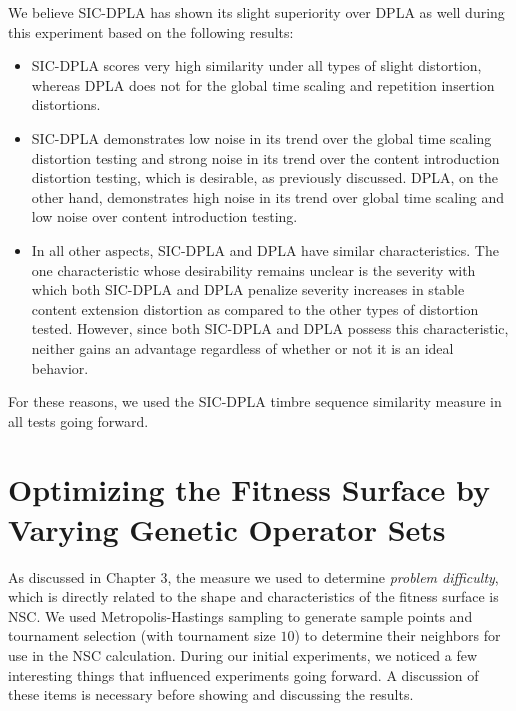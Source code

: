 \documentclass[a4paper,12pt]{report} 	%
\numberwithin{figure}{chapter}
\numberwithin{table}{chapter}
\numberwithin{equation}{chapter}
\begin{document}
\begin{flushleft}
We believe SIC-DPLA has shown its slight superiority over DPLA as well during this experiment based on the following results:
\begin{itemize}
\item SIC-DPLA scores very high similarity under all types of slight distortion, whereas DPLA does not for the global time scaling and repetition insertion distortions. 
\item SIC-DPLA demonstrates low noise in its trend over the global time scaling distortion testing and strong noise in its trend over the content introduction distortion testing, which is desirable, as previously discussed. DPLA, on the other hand, demonstrates high noise in its trend over global time scaling and low noise over content introduction testing.
\item In all other aspects, SIC-DPLA and DPLA have similar characteristics. The one characteristic whose desirability remains unclear is the severity with which both SIC-DPLA and DPLA penalize severity increases in stable content extension distortion as compared to the other types of distortion tested. However, since both SIC-DPLA and DPLA possess this characteristic, neither gains an advantage regardless of whether or not it is an ideal behavior.
\end{itemize}

For these reasons, we used the SIC-DPLA timbre sequence similarity measure in all tests going forward.

\section{Optimizing the Fitness Surface by Varying Genetic Operator Sets}
As discussed in Chapter 3, the measure we used to determine \emph{problem difficulty}, which is directly related to the shape and characteristics of the fitness surface is NSC. We used Metropolis-Hastings sampling to generate sample points and tournament selection (with tournament size $10$) to determine their neighbors for use in the NSC calculation. During our initial experiments, we noticed a few interesting things that influenced experiments going forward. A discussion of these items is necessary before showing and discussing the results.

\end{flushleft}
\end{document}
